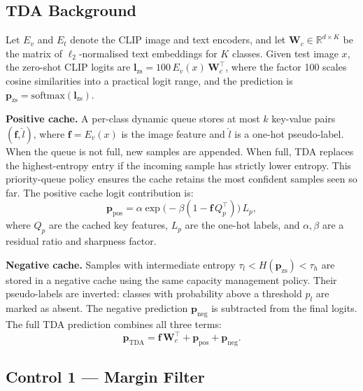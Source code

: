 \documentclass[10pt,twocolumn,letterpaper]{article}
\begin{document}
\subsection{TDA Background}
\label{subsec:tda}

Let $E_v$ and $E_t$ denote the CLIP image and text encoders,
and let $\mathbf{W}_c \in \mathbb{R}^{d \times K}$ be the matrix
of $\ell_2$-normalised text embeddings for $K$ classes.
Given test image $x$, the zero-shot CLIP logits are
$\mathbf{l}_\text{zs} = 100\,E_v(x)\,\mathbf{W}_c^\top$,
where the factor 100 scales cosine similarities into a practical
logit range, and the prediction is
$\mathbf{p}_\text{zs} = \text{softmax}(\mathbf{l}_\text{zs})$.

\textbf{Positive cache.}
A per-class dynamic queue stores at most $k$ key-value pairs
$(\mathbf{f}, \hat{l})$, where $\mathbf{f} = E_v(x)$ is the
image feature and $\hat{l}$ is a one-hot pseudo-label.
When the queue is not full, new samples are appended.
When full, TDA replaces the highest-entropy entry if the incoming
sample has strictly lower entropy.
This priority-queue policy ensures the cache retains the most
confident samples seen so far.
The positive cache logit contribution is:
\begin{equation}
  \mathbf{p}_\text{pos} =
    \alpha \exp\!\bigl(-\beta(1 - \mathbf{f}\,Q_p^\top)\bigr)\,L_p,
\end{equation}
where $Q_p$ are the cached key features, $L_p$ are the one-hot
labels, and $\alpha, \beta$ are a residual ratio and sharpness factor.

\textbf{Negative cache.}
Samples with intermediate entropy
$\tau_l < H(\mathbf{p}_\text{zs}) < \tau_h$ are stored in a
negative cache using the same capacity management policy.
Their pseudo-labels are inverted: classes with probability above
a threshold $p_l$ are marked as absent.
The negative prediction $\mathbf{p}_\text{neg}$ is subtracted from
the final logits.
The full TDA prediction combines all three terms:
\begin{equation}
  \mathbf{p}_\text{TDA} =
    \mathbf{f}\,\mathbf{W}_c^\top +
    \mathbf{p}_\text{pos} +
    \mathbf{p}_\text{neg}.
\end{equation}

\subsection{Control 1 --- Margin Filter}
\label{subsec:margin}
\end{document}
